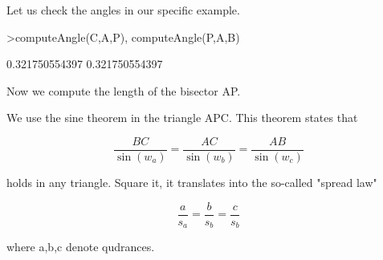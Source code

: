 \documentclass{article}
\begin{document}
\begin{eulernotebook}
\begin{eulercomment}
\begin{eulercomment}
\begin{eulercomment}
\begin{eulercomment}
\begin{eulercomment}
\begin{eulercomment}
\begin{eulercomment}
Let us check the angles in our specific example.
\end{eulercomment}
\begin{eulerprompt}
>computeAngle(C,A,P), computeAngle(P,A,B)
\end{eulerprompt}
\begin{euleroutput}
  0.321750554397
  0.321750554397
\end{euleroutput}
\begin{eulercomment}
Now we compute the length of the bisector AP.

We use the sine theorem in the triangle APC. This theorem states that

\end{eulercomment}
\begin{eulerformula}
\[
\frac{BC}{\sin(w_a)} = \frac{AC}{\sin(w_b)} = \frac{AB}{\sin(w_c)}
\]
\end{eulerformula}
\begin{eulercomment}
holds in any triangle. Square it, it translates into the so-called
"spread law"

\end{eulercomment}
\begin{eulerformula}
\[
\frac{a}{s_a} = \frac{b}{s_b} = \frac{c}{s_b}
\]
\end{eulerformula}
\begin{eulercomment}
where a,b,c denote qudrances.


\end{eulercomment}
\end{eulercomment}
\end{eulercomment}
\end{eulercomment}
\end{eulercomment}
\end{eulercomment}
\end{eulercomment}
\end{eulernotebook}
\end{document}
